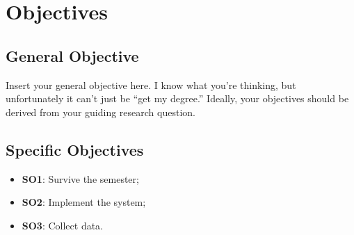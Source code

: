 \section{Objectives}
\label{sec:objetivos}

\subsection{General Objective}
\label{sub:objetivogeral}

Insert your general objective here. I know what you're thinking, but unfortunately it can't just be \enquote{get my degree.} Ideally, your objectives should be derived from your guiding research question.

\subsection{Specific Objectives}
\label{sub:objetivosespecifos}

\begin{itemize}
    \item \textbf{SO1}: Survive the semester;
    \item \textbf{SO2}: Implement the system;
    \item \textbf{SO3}: Collect data.
\end{itemize}

